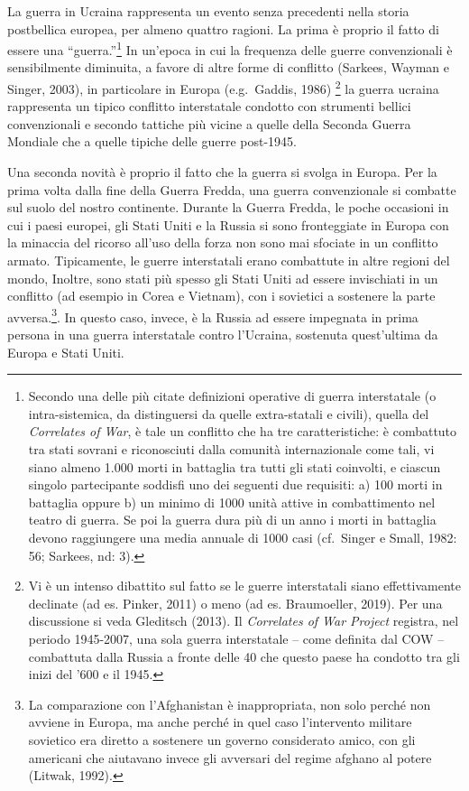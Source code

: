 \documentclass[
]{book}
\begin{document}
La guerra in Ucraina rappresenta un evento senza precedenti nella storia postbellica europea, per almeno quattro ragioni. La prima è proprio il fatto di essere una ``guerra.''\footnote{Secondo una delle più citate definizioni operative di guerra interstatale (o intra-sistemica, da distinguersi da quelle extra-statali e civili), quella del \emph{Correlates of War}, è tale un conflitto che ha tre caratteristiche: è combattuto tra stati sovrani e riconosciuti dalla comunità internazionale come tali, vi siano almeno 1.000 morti in battaglia tra tutti gli stati coinvolti, e ciascun singolo partecipante soddisfi uno dei seguenti due requisiti: a) 100 morti in battaglia oppure b) un minimo di 1000 unità attive in combattimento nel teatro di guerra. Se poi la guerra dura più di un anno i morti in battaglia devono raggiungere una media annuale di 1000 casi (cf.~Singer e Small, 1982: 56; Sarkees, nd: 3).} In un'epoca in cui la frequenza delle guerre convenzionali è sensibilmente diminuita, a favore di altre forme di conflitto (Sarkees, Wayman e Singer, 2003), in particolare in Europa (e.g.~Gaddis, 1986) \footnote{Vi è un intenso dibattito sul fatto se le guerre interstatali siano effettivamente declinate (ad es. Pinker, 2011) o meno (ad es. Braumoeller, 2019). Per una discussione si veda Gleditsch (2013). Il \emph{Correlates of War Project} registra, nel periodo 1945-2007, una sola guerra interstatale -- come definita dal COW -- combattuta dalla Russia a fronte delle 40 che questo paese ha condotto tra gli inizi del '600 e il 1945.} la guerra ucraina rappresenta un tipico conflitto interstatale condotto con strumenti bellici convenzionali e secondo tattiche più vicine a quelle della Seconda Guerra Mondiale che a quelle tipiche delle guerre post-1945.

Una seconda novità è proprio il fatto che la guerra si svolga in Europa. Per la prima volta dalla fine della Guerra Fredda, una guerra convenzionale si combatte sul suolo del nostro continente. Durante la Guerra Fredda, le poche occasioni in cui i paesi europei, gli Stati Uniti e la Russia si sono fronteggiate in Europa con la minaccia del ricorso all'uso della forza non sono mai sfociate in un conflitto armato. Tipicamente, le guerre interstatali erano combattute in altre regioni del mondo, Inoltre, sono stati più spesso gli Stati Uniti ad essere invischiati in un conflitto (ad esempio in Corea e Vietnam), con i sovietici a sostenere la parte avversa.\footnote{La comparazione con l'Afghanistan è inappropriata, non solo perché non avviene in Europa, ma anche perché in quel caso l'intervento militare sovietico era diretto a sostenere un governo considerato amico, con gli americani che aiutavano invece gli avversari del regime afghano al potere (Litwak, 1992).}. In questo caso, invece, è la Russia ad essere impegnata in prima persona in una guerra interstatale contro l'Ucraina, sostenuta quest'ultima da Europa e Stati Uniti.
\end{document}
